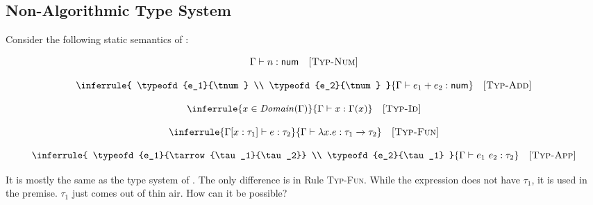 \subsection{Non-Algorithmic Type System}

Consider the following static semantics of \lang:


\vspace{-1em}

\[
  \Gamma\vdash n:\textsf{num}
  \quad\textsc{[Typ-Num]}
\]


\vspace{-1em}

\[
  \inferrule
  { \typeofd{e_1}{\tnum} \\ \typeofd{e_2}{\tnum} }
  { \typeofd{e_1+e_2}{\tnum} }
  \quad\textsc{[Typ-Add]}
\]


\vspace{-1em}

\[
  \inferrule
  { x\in\dom{\Gamma} }
  { \typeofd{x}{\Gamma(x)} }
  \quad\textsc{[Typ-Id]}
\]


\vspace{-1em}

\[
  \inferrule
  { \typeof{\Gamma[x:\tau_1]}{e}{\tau_2} }
  { \typeofd{\efun{x}{e}}{\tarrow{\tau_1}{\tau_2}} }
  \quad\textsc{[Typ-Fun]}
\]


\vspace{-1em}

\[
  \inferrule
  { \typeofd{e_1}{\tarrow{\tau_1}{\tau_2}} \\
    \typeofd{e_2}{\tau_1} }
  { \typeofd{e_1\ e_2}{\tau_2} }
  \quad\textsc{[Typ-App]}
\]

It is mostly the same as the type system of \plang. The only difference is in Rule
\textsc{Typ-Fun}. While the expression does not have $\tau_1$, it is used in the
premise. $\tau_1$ just comes out of thin air. How can it be possible?

